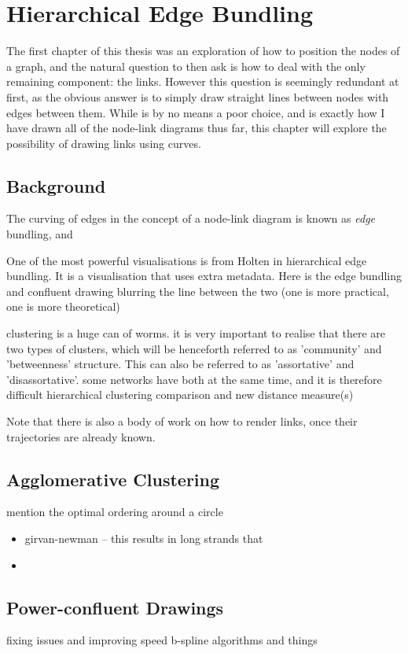 \chapter{Hierarchical Edge Bundling}
The first chapter of this thesis was an exploration of how to position the nodes of a graph, and the natural question to then ask is how to deal with the only remaining component: the links. However this question is seemingly redundant at first, as the obvious answer is to simply draw straight lines between nodes with edges between them. While is by no means a poor choice, and is exactly how I have drawn all of the node-link diagrams thus far, this chapter will explore the possibility of drawing links using curves.

\section{Background}
The curving of edges in the concept of a node-link diagram is known as \textit{edge} bundling, and 

One of the most powerful visualisations is from Holten in hierarchical edge bundling. It is a visualisation that uses extra metadata. Here is the 
edge bundling and confluent drawing
blurring the line between the two (one is more practical, one is more theoretical)

clustering is a huge can of worms.
it is very important to realise that there are two types of clusters, which will be henceforth referred to as 'community' and 'betweenness' structure. This can also be referred to as 'assortative' and 'disassortative'.
some networks have both at the same time, and it is therefore difficult 
hierarchical clustering comparison and new distance measure(s)

Note that there is also a body of work on how to render links, once their trajectories are already known.

\section{Agglomerative Clustering}

mention the optimal ordering around a circle

\begin{itemize}
    \item girvan-newman -- this results in long strands that \item
\end{itemize}

\section{Power-confluent Drawings}
fixing issues and improving speed
b-spline algorithms and things